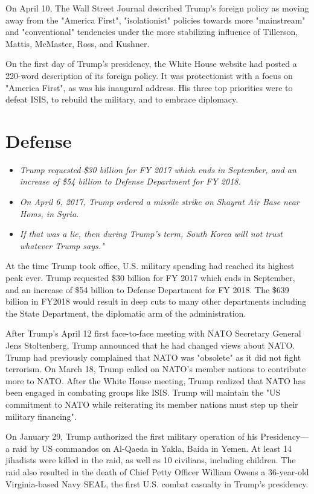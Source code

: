 On April 10, The Wall Street Journal described Trump's foreign policy as
moving away from the "America First", "isolationist" policies towards
more "mainstream" and "conventional" tendencies under the more
stabilizing influence of Tillerson, Mattis, McMaster, Ross, and Kushner.

On the first day of Trump's presidency, the White House website had
posted a 220-word description of its foreign policy. It was
protectionist with a focus on "America First", as was his inaugural
address. His three top priorities were to defeat ISIS, to rebuild the
military, and to embrace diplomacy.

\section{Defense}\label{defense}

\begin{itemize}
\item
  \emph{Trump requested \$30 billion for FY 2017 which ends in
  September, and an increase of \$54 billion to Defense Department for
  FY 2018.}
\item
  \emph{On April 6, 2017, Trump ordered a missile strike on Shayrat Air
  Base near Homs, in Syria.}
\item
  \emph{If that was a lie, then during Trump's term, South Korea will
  not trust whatever Trump says."}
\end{itemize}

At the time Trump took office, U.S. military spending had reached its
highest peak ever. Trump requested \$30 billion for FY 2017 which ends
in September, and an increase of \$54 billion to Defense Department for
FY 2018. The \$639 billion in FY2018 would result in deep cuts to many
other departments including the State Department, the diplomatic arm of
the administration.

After Trump's April 12 first face-to-face meeting with NATO Secretary
General Jens Stoltenberg, Trump announced that he had changed views
about NATO. Trump had previously complained that NATO was "obsolete" as
it did not fight terrorism. On March 18, Trump called on NATO's member
nations to contribute more to NATO. After the White House meeting, Trump
realized that NATO has been engaged in combating groups like ISIS. Trump
will maintain the "US commitment to NATO while reiterating its member
nations must step up their military financing".

On January 29, Trump authorized the first military operation of his
Presidency---a raid by US commandos on Al-Qaeda in Yakla, Baida in
Yemen. At least 14 jihadists were killed in the raid, as well as 10
civilians, including children. The raid also resulted in the death of
Chief Petty Officer William Owens a 36-year-old Virginia-based Navy
SEAL, the first U.S. combat casualty in Trump's presidency.

